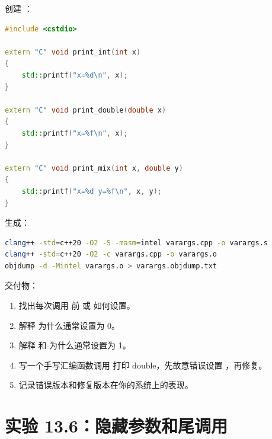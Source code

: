 \begin{labbox}
创建 ：

\begin{lstlisting}[language=C++]
#include <cstdio>

extern "C" void print_int(int x)
{
    std::printf("x=%d\n", x);
}

extern "C" void print_double(double x)
{
    std::printf("x=%f\n", x);
}

extern "C" void print_mix(int x, double y)
{
    std::printf("x=%d y=%f\n", x, y);
}
\end{lstlisting}

生成：

\begin{lstlisting}[language=bash]
clang++ -std=c++20 -O2 -S -masm=intel varargs.cpp -o varargs.s
clang++ -std=c++20 -O2 -c varargs.cpp -o varargs.o
objdump -d -Mintel varargs.o > varargs.objdump.txt
\end{lstlisting}

交付物：

\begin{enumerate}
  \item 找出每次调用  前  或  如何设置。
  \item 解释  为什么通常设置为 0。
  \item 解释  和  为什么通常设置为 1。
  \item 写一个手写汇编函数调用  打印 double，先故意错误设置 ，再修复。
  \item 记录错误版本和修复版本在你的系统上的表现。
\end{enumerate}
\end{labbox}

\section{实验 13.6：隐藏参数和尾调用}

